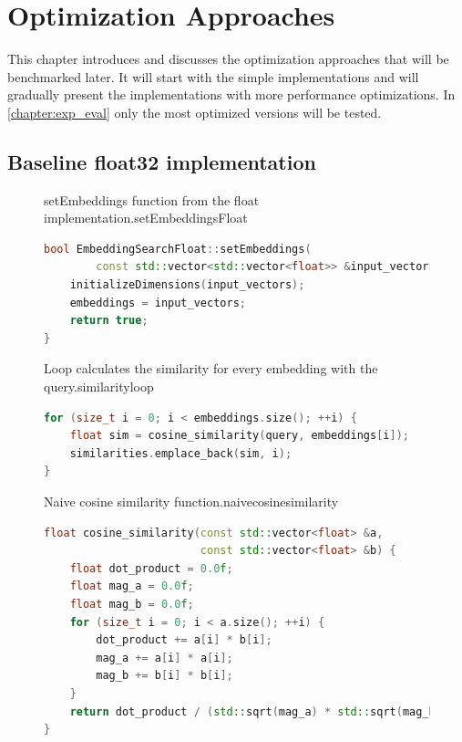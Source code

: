 \chapter{Optimization Approaches}
\label{optapproaches}
This chapter introduces and discusses the optimization approaches that will be benchmarked later. It will start with the simple implementations and will gradually present the implementations with more performance optimizations. In \autoref{chapter:exp_eval} only the most optimized versions will be tested.
\section{Baseline float32 implementation}
\label{naivefloat}
\begin{figure}[h]
    \begin{algorithm}{setEmbeddings function from the float implementation.}{setEmbeddingsFloat}
        \begin{lstlisting}[language=C++]
bool EmbeddingSearchFloat::setEmbeddings(
        const std::vector<std::vector<float>> &input_vectors) {
    initializeDimensions(input_vectors);
    embeddings = input_vectors;
    return true;
}
    \end{lstlisting}
    \end{algorithm}
\end{figure}

\begin{figure}[h]
    \begin{algorithm}{Loop calculates the similarity for every embedding with the query.}{similarityloop}
        \begin{lstlisting}[language=C++]
for (size_t i = 0; i < embeddings.size(); ++i) {
    float sim = cosine_similarity(query, embeddings[i]);
    similarities.emplace_back(sim, i);
}
    \end{lstlisting}
    \end{algorithm}
\end{figure}

\begin{figure}[h]
    \begin{algorithm}{Naive cosine similarity function.}{naivecosinesimilarity}
        \begin{lstlisting}[language=C++]
float cosine_similarity(const std::vector<float> &a,
                        const std::vector<float> &b) {
    float dot_product = 0.0f;
    float mag_a = 0.0f;
    float mag_b = 0.0f;
    for (size_t i = 0; i < a.size(); ++i) {
        dot_product += a[i] * b[i];
        mag_a += a[i] * a[i];
        mag_b += b[i] * b[i];
    }
    return dot_product / (std::sqrt(mag_a) * std::sqrt(mag_b));
}
    \end{lstlisting}
    \end{algorithm}
\end{figure}

